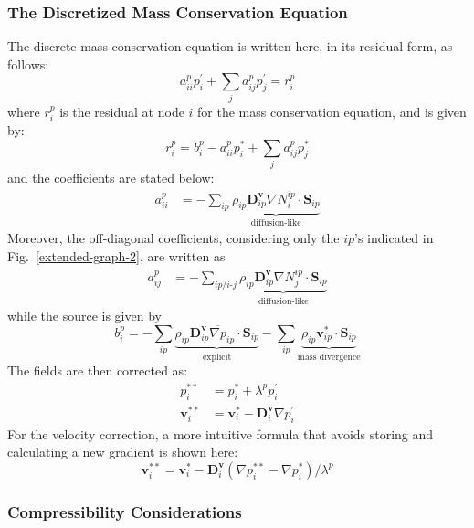 \documentclass[12pt]{extarticle}
\newcommand{\<}{\langle}
\renewcommand{\>}{\rangle}
\theoremstyle{definition}
\begin{document}
\subsubsection{{The Discretized Mass Conservation Equation}}

The discrete mass conservation equation is written here, in its residual form, as follows:
\begin{equation}
    a_{ii}^{p} p_i^\prime + \sum_{j} a_{ij}^{p} p_j^\prime = r_i^p
    \label{eq:seg_mass}
\end{equation}
where $r_i^p$ is the residual at node $i$ for the mass conservation equation, and is given by:
\begin{equation}
    r_i^p = b_i^p - a_{ii}^{p} p_i^* + \sum_{j} a_{ij}^{p} p_j^*
\end{equation}
and the coefficients are stated below:
\begin{align}
    a_{ii}^{p} &= -\sum_{ip}\underbrace{\rho_{ip}\textbf{D}^{\textbf{v}}_{ip} \nabla N_i^{ip} \cdot \textbf{S}_{ip}}_\text{diffusion-like}
\end{align}
Moreover, the off-diagonal coefficients, considering only the $ip$'s indicated in Fig.~\ref{extended-graph-2}, are written as
\begin{align}
    a_{ij}^{p} &= -\sum_{ip/i\text{-}j}\underbrace{\rho_{ip} \textbf{D}^{\textbf{v}}_{ip} \nabla N_j^{ip} \cdot \textbf{S}_{ip}}_\text{diffusion-like}
\end{align}
while the source is given by
\begin{equation}
    b_i^{p} = -\sum_{ip}\underbrace{\rho_{ip}\textbf{D}^{\textbf{v}}_{ip} \overline{\nabla p}_{ip} \cdot \textbf{S}_{ip}}_{\text{explicit}}-\sum_{ip} \underbrace{\rho_{ip}\textbf{v}^*_{ip} \cdot \textbf{S}_{ip}}_{\text{mass divergence}}
\end{equation}
The fields are then corrected as:
\begin{align}
p_i^{**} &= p_i^{*} + \lambda^p p_i^{\prime} \\
\textbf{v}_i^{**} &= \textbf{v}_i^{*}  - \textbf{D}^{\textbf{v}}_i \nabla p^\prime_i
\end{align}
For the velocity correction, a more intuitive formula that avoids storing and calculating a new gradient is shown here:
\begin{equation}
    \textbf{v}_i^{**} = \textbf{v}_i^{*}  - \textbf{D}^{\textbf{v}}_i \left(\nabla p^{**}_i - \nabla p^{*}_i\right) / \lambda^p
\end{equation}

\subsubsection{Compressibility Considerations}
\end{document}
